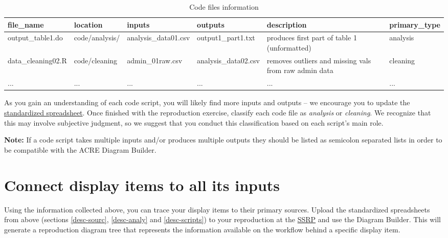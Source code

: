 \documentclass[
]{book}
\begin{document}
\begin{table}

\caption{\label{tab:code-files-information}Code files information}
\centering
\begin{tabu} to 
\hline
file\_name & location & inputs & outputs & description & primary\_type\\
\hline
output\_table1.do & code/analysis/ & analysis\_data01.csv & output1\_part1.txt & produces first part of table 1 (unformatted) & analysis\\
\hline
data\_cleaning02.R & code/cleaning & admin\_01raw.csv & analysis\_data02.csv & removes outliers and missing vals from raw admin data & cleaning\\
\hline
... & ... & ... & ... & ... & ...\\
\hline
\end{tabu}
\end{table}

As you gain an understanding of each code script, you will likely find more inputs and outputs -- we encourage you to update the \href{https://docs.google.com/spreadsheets/d/1LUIdVFH0OfR70C7z07TYeE-uWzKI_JIeWUMaYhqEKK0/edit\#gid=1617799822\&range=A1}{standardized spreadsheet}. Once finished with the reproduction exercise, classify each code file as \emph{analysis} or \emph{cleaning}. We recognize that this may involve subjective judgment, so we suggest that you conduct this classification based on each script's main role.

\textbf{Note:} If a code script takes multiple inputs and/or produces multiple outputs they should be listed as semicolon separated lists in order to be compatible with the ACRE Diagram Builder.

\hypertarget{diagram}{%
\section{Connect display items to all its inputs}\label{diagram}}

Using the information collected above, you can trace your display items to their primary sources. Upload the standardized spreadsheets from above (sections \ref{desc-sourc}, \ref{desc-analy} and \ref{desc-scripts}) to your reproduction at the \href{https://www.socialsciencereproduction.org}{SSRP} and use the Diagram Builder. This will generate a reproduction diagram tree that represents the information available on the workflow behind a specific display item.
\end{document}

